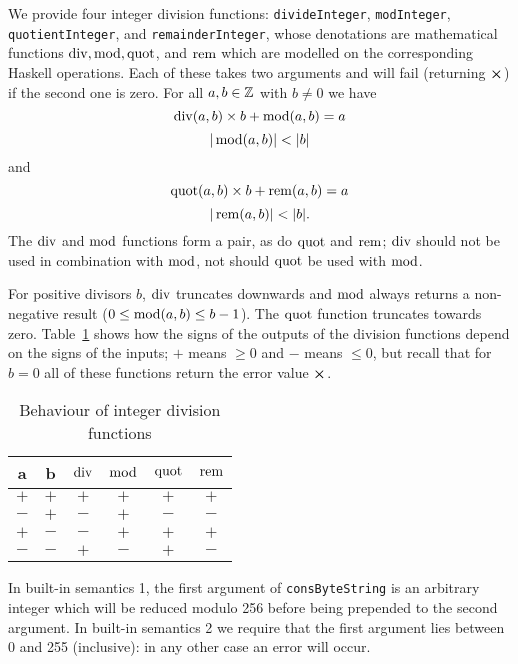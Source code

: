 \label{note:integer-division-functions}
We provide four integer division functions: \texttt{divideInteger},
\texttt{modInteger}, \texttt{quotientInteger}, and \texttt{remainderInteger},
whose denotations are mathematical functions $\operatorname{div}, \operatorname{mod}, \operatorname{quot}$, and
$\operatorname{rem}$ which are modelled on the corresponding Haskell operations. Each of
these takes two arguments and will fail (returning $\errorX$) if the second one
is zero.  For all $a,b \in \mathbb{Z}$ with $b \ne 0$ we have
$$
\operatorname{div}(a,b) \times b + \operatorname{mod}(a,b) = a
$$
$$
  |\operatorname{mod}(a,b)| < |b|
$$\noindent and
$$
  \operatorname{quot}(a,b) \times b + \operatorname{rem}(a,b) = a
$$
$$
  |\operatorname{rem}(a,b)| < |b|.
$$
\noindent The $\operatorname{div}$ and $\operatorname{mod}$ functions form a pair, as do $\operatorname{quot}$ and $\operatorname{rem}$;
$\operatorname{div}$ should not be used in combination with $\operatorname{mod}$, not should $\operatorname{quot}$ be used
with $\operatorname{mod}$.

For positive divisors $b$, $\operatorname{div}$ truncates downwards and $\operatorname{mod}$ always
returns a non-negative result ($0 \leq \operatorname{mod}(a,b) \leq b-1$).  The $\operatorname{quot}$
function truncates towards zero.  Table~\ref{table:integer-division-signs} shows
how the signs of the outputs of the division functions depend on the signs of
the inputs; $+$ means $\geq 0$ and $-$ means $\leq 0$, but recall that for $b=0$
all of these functions return the error value $\errorX$.
\begin{table}[H]
  \centering
    \begin{tabular}{|cc|cc|cc|}
        \hline
        a & b & $\operatorname{div}$ & $\operatorname{mod}$ & $\operatorname{quot}$ & $\operatorname{rem}$ \\
        \hline
        $+$ & $+$ & $+$ & $+$ & $+$ & $+$ \\
        $-$ & $+$ & $-$ & $+$ & $-$ & $-$ \\
        $+$ & $-$ & $-$ & $+$ & $+$ & $+$ \\
        $-$ & $-$ & $+$ & $-$ & $+$ & $-$ \\
        \hline
        \end{tabular}
   \caption{Behaviour of integer division functions}
   \label{table:integer-division-signs}
\end{table}

\label{note:consbytestring}
In built-in semantics 1, the first argument of \texttt{consByteString} is an
arbitrary integer which will be reduced modulo 256 before being prepended to the
second argument.  In built-in semantics 2 we require that the first argument lies between 0
and 255 (inclusive): in any other case an error will occur.


